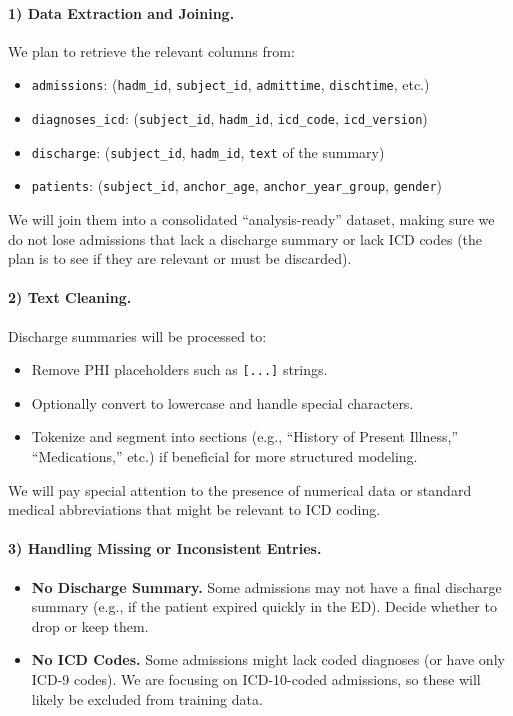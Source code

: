 \documentclass[12pt,a4paper]{report}
\begin{document}
\paragraph{1) Data Extraction and Joining.}
We plan to retrieve the relevant columns from:
\begin{itemize}
    \item \texttt{admissions}: (\texttt{hadm\_id}, \texttt{subject\_id}, \texttt{admittime}, \texttt{dischtime}, etc.)
    \item \texttt{diagnoses\_icd}: (\texttt{subject\_id}, \texttt{hadm\_id}, \texttt{icd\_code}, \texttt{icd\_version})
    \item \texttt{discharge}: (\texttt{subject\_id}, \texttt{hadm\_id}, \texttt{text} of the summary)
    \item \texttt{patients}: (\texttt{subject\_id}, \texttt{anchor\_age}, \texttt{anchor\_year\_group}, \texttt{gender})
\end{itemize}
We will join them into a consolidated “analysis-ready” dataset, making sure we do not lose admissions that lack a discharge summary or lack ICD codes (the plan is to see if they are relevant or must be discarded).

\paragraph{2) Text Cleaning.}
Discharge summaries will be processed to:
\begin{itemize}
    \item Remove PHI placeholders such as \texttt{[\*\*...\*\*]} strings.
    \item Optionally convert to lowercase and handle special characters.
    \item Tokenize and segment into sections (e.g., “History of Present Illness,” “Medications,” etc.) if beneficial for more structured modeling.
\end{itemize}
We will pay special attention to the presence of numerical data or standard medical abbreviations that might be relevant to ICD coding.

\paragraph{3) Handling Missing or Inconsistent Entries.}
\begin{itemize}
    \item \textbf{No Discharge Summary.} Some admissions may not have a final discharge summary (e.g., if the patient expired quickly in the ED). Decide whether to drop or keep them.
    \item \textbf{No ICD Codes.} Some admissions might lack coded diagnoses (or have only ICD-9 codes). We are focusing on ICD-10-coded admissions, so these will likely be excluded from training data.
\end{itemize}
\end{document}
